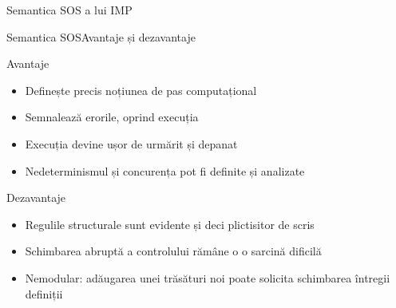 \documentclass[xcolor=pdftex,romanian,colorlinks]{beamer}
\begin{document}
\begin{section}{Semantica SOS a lui IMP}
  \begin{frame}{Semantica SOS}{Avantaje și dezavantaje}
  \begin{block}{Avantaje}
  \begin{itemize}
  \item Definește precis noțiunea de pas computațional
  \item Semnalează erorile, oprind execuția
  \item Execuția devine ușor de urmărit și depanat
  \item Nedeterminismul și concurența pot fi definite și analizate
  \end{itemize}
  \end{block}
  \vfill\begin{alertblock}{Dezavantaje}
  \begin{itemize}
  \item Regulile structurale sunt evidente și deci plictisitor de scris
  \item Schimbarea abruptă a controlului rămâne o o sarcină dificilă
  \item Nemodular: adăugarea unei trăsături noi poate solicita schimbarea întregii definiții
  \end{itemize}
  \end{alertblock}
  \end{frame}

  \end{section}
\end{document}
